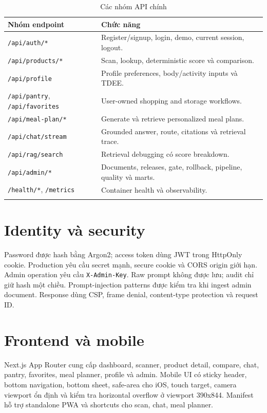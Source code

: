 \documentclass[12pt,a4paper]{report}
\newcommand{\code}[1]{\texttt{#1}}
\begin{document}
\begin{longtable}{p{}p{}}
\toprule
\textbf{Nhóm endpoint} & \textbf{Chức năng}\\
\midrule
\endhead
\code{/api/auth/*} & Register/signup, login, demo, current session, logout.\\
\code{/api/products/*} & Scan, lookup, deterministic score và comparison.\\
\code{/api/profile} & Profile preferences, body/activity inputs và TDEE.\\
\code{/api/pantry}, \code{/api/favorites} & User-owned shopping and storage workflows.\\
\code{/api/meal-plan/*} & Generate và retrieve personalized meal plans.\\
\code{/api/chat/stream} & Grounded answer, route, citations và retrieval trace.\\
\code{/api/rag/search} & Retrieval debugging có score breakdown.\\
\code{/api/admin/*} & Documents, releases, gate, rollback, pipeline, quality và marts.\\
\code{/health/*}, \code{/metrics} & Container health và observability.\\
\bottomrule
\caption{Các nhóm API chính}
\end{longtable}

\section{Identity và security}

Password được hash bằng Argon2; access token dùng JWT trong HttpOnly cookie.
Production yêu cầu secret mạnh, secure cookie và CORS origin giới hạn. Admin
operation yêu cầu \code{X-Admin-Key}. Raw prompt không được lưu; audit chỉ giữ
hash một chiều. Prompt-injection patterns được kiểm tra khi ingest admin
document. Response dùng CSP, frame denial, content-type protection và request
ID.

\section{Frontend và mobile}

Next.js App Router cung cấp dashboard, scanner, product detail, compare, chat,
pantry, favorites, meal planner, profile và admin. Mobile UI có sticky header,
bottom navigation, bottom sheet, safe-area cho iOS, touch target, camera viewport
ổn định và kiểm tra horizontal overflow ở viewport 390x844. Manifest hỗ trợ
standalone PWA và shortcuts cho scan, chat, meal planner.
\end{document}
